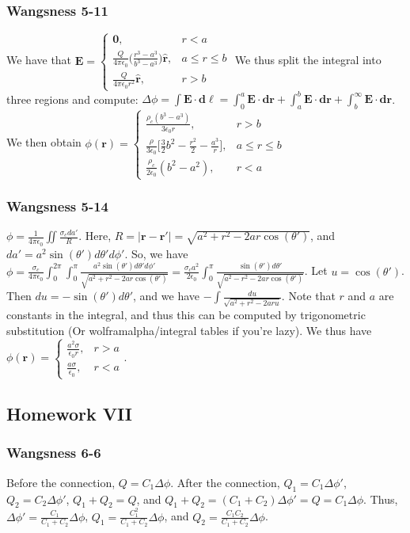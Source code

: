 \documentclass[oneside]{book}
\theoremstyle{mystyle}
\begin{document}
\subsubsection{Wangsness 5-11}
We have that $\mathbf{E} = \begin{cases} \mathbf{0}, & r<a\\ \frac{Q}{4\pi \epsilon_0}\bigg(\frac{r^3-a^3}{b^3-a^3}\bigg)\hat{\mathbf{r}}, & a\leq r \leq b\\ \frac{Q}{4\pi \epsilon_0 r^2}\hat{\mathbf{r}}, & r>b\end{cases}$ We thus split the integral into three regions and compute: $\Delta\phi=\int \mathbf{E}\cdot \mathbf{d\ell} = \int_{0}^{a} \mathbf{E}\cdot \mathbf{dr}+\int_{a}^{b} \mathbf{E}\cdot \mathbf{dr}+\int_{b}^{\infty} \mathbf{E}\cdot \mathbf{dr}$. We then obtain $\phi(\mathbf{r}) = \begin{cases} \frac{\rho_c(b^3-a^3)}{3\epsilon_0 r}, & r>b \\ \frac{\rho}{3\epsilon_0}\bigg[ \frac{3}{2}b^2-\frac{r^2}{2}-\frac{a^3}{r}\bigg], & a\leq r \leq b\\ \frac{\rho_c}{2\epsilon_0}(b^2-a^2), & r<a\end{cases}$
\subsubsection{Wangsness 5-14}
$\phi = \frac{1}{4\pi \epsilon_0}\iint \frac{\sigma_c da'}{R}$. Here, $R = |\mathbf{r}-\mathbf{r}'| = \sqrt{a^2+r^2-2ar\cos(\theta')}$, and $da' = a^2\sin(\theta')d\theta'd\phi'$. So, we have $\phi = \frac{\sigma_c}{4\pi \epsilon_0}\int_{0}^{2\pi}\int_{0}^{\pi} \frac{a^2\sin(\theta')d\theta' d\phi'}{\sqrt{a^2+r^2-2ar\cos(\theta')}} = \frac{\sigma_c a^2}{2\epsilon_0}\int_{0}^{\pi} \frac{\sin(\theta')d\theta'}{\sqrt{a^2-r^2-2ar\cos(\theta')}}$. Let $u = \cos(\theta')$. Then $du = -\sin(\theta')d\theta'$, and we have $-\int\frac{du}{\sqrt{a^2+r^2-2aru}}$. Note that $r$ and $a$ are constants in the integral, and thus this can be computed by trigonometric substitution (Or wolframalpha/integral tables if you're lazy). We thus have $\phi(\mathbf{r}) = \begin{cases}\frac{a^2\sigma}{\epsilon_0 r}, & r>a \\ \frac{a\sigma}{\epsilon_0}, & r<a\end{cases}$.
\subsection{Homework VII}
\subsubsection{Wangsness 6-6}
Before the connection, $Q=C_1 \Delta \phi$. After the connection, $Q_1 = C_1 \Delta\phi'$, $Q_2 = C_2 \Delta \phi'$, $Q_1+Q_2=Q$, and $Q_1+Q_2=(C_1+C_2)\Delta \phi' = Q = C_1\Delta \phi$. Thus, $\Delta \phi' = \frac{C_1}{C_1+C_2}\Delta \phi$, $Q_1 = \frac{C_1^2}{C_1+C_2}\Delta \phi$, and $Q_2 = \frac{C_1 C_2}{C_1+C_2}\Delta \phi$.
\end{document}
